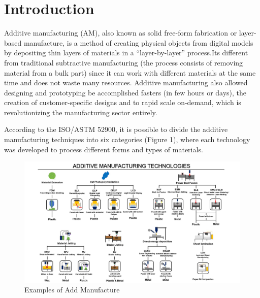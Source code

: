 \section{Introduction}

Additive manufacturing (AM), also known as solid free-form fabrication or layer-based manufacture, is a method of creating physical objects from digital models by depositing thin layers of materials in a “layer-by-layer” process.Its different from traditional subtractive manufacturing (the process consists of removing material from a bulk part) since it can work with different materials at the same time and does not waste many resources. Additive manufacturing also allowed designing and prototyping be accomplished fasters (in few hours or days), the creation of customer-specific designs and to rapid scale on-demand, which is revolutionizing the manufacturing sector entirely.

According to the ISO/ASTM 52900, it is possible to divide the additive manufacturing techniques into six categories (Figure 1), where each technology was developed to process different forms and types of materials.

\begin{figure}[h]
	\centering
	\includegraphics[width=0.7\linewidth]{"figs/Add Manuf Tech"}
	\caption{Examples of Add Manufacture}
	\label{fig:add-manuf-tech}
\end{figure}
